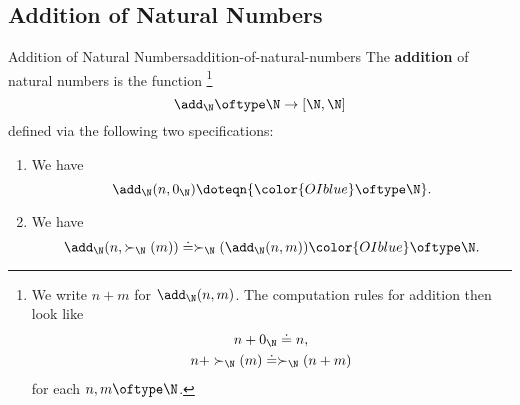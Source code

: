 \subsection{Addition of Natural Numbers}\label{subsection-martin-löf-type-theory-addition-of-natural-numbers}
\begin{definition}{Addition of Natural Numbers}{addition-of-natural-numbers}%
    The \textbf{addition} of natural numbers is the function%
    \footnote{%
        We write $n+m$ for $\add_{\N}(n,m)$. The computation rules for addition then look like
        \[
            \begin{gathered}
                n+0_{\N}        \doteq n,\\
                n+\succ_{\N}(m) \doteq \succ_{\N}(n+m)
            \end{gathered}
        \]%
        for each $n,m\oftype\N$.
        \par\vspace*{\TCBBoxCorrection}
    }%
    \[
        \add_{\N}%
        \oftype%
        \N%
        \to%
        [\N,\N]%
    \]%
    defined via the following two specifications:%
    \begin{enumerate}
        \item\label{addition-of-natural-numbers-the-base-case}We have
            \[
                \add_{\N}(n,0_{\N})%
                \doteq%
                n%
                {\color{OIblue}\oftype\N}.%
            \]%
        \item\label{addition-of-natural-numbers-the-inductive-step}We have
            \[
                \add_{\N}(n,\succ_{\N}(m))%
                \doteq%
                \succ_{\N}(\add_{\N}(n,m))%
                {\color{OIblue}\oftype\N}.%
            \]%
    \end{enumerate}
\end{definition}
